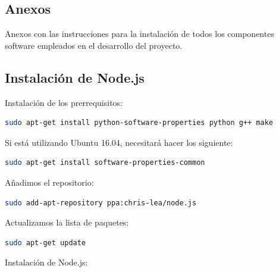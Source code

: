 

\newpage

\begin{appendix}
\backmatter

\chapter{Anexos}
\label{appendix:anexos}


Anexos con las instrucciones para la instalación de todos los componentes software empleados en el desarrollo del proyecto.\\

\section{Instalación de Node.js}


Instalación de los prerrequisitos:\\

\begin{lstlisting}[language=bash]
sudo apt-get install python-software-properties python g++ make
\end{lstlisting}


Si está utilizando Ubuntu 16.04, necesitará hacer los siguiente:\\

\begin{lstlisting}[language=bash]
sudo apt-get install software-properties-common
\end{lstlisting}


Añadimos el repositorio:\\

\begin{lstlisting}[language=bash]
sudo add-apt-repository ppa:chris-lea/node.js
\end{lstlisting}

Actualizamos la lista de paquetes:\\

\begin{lstlisting}[language=bash]
sudo apt-get update
\end{lstlisting}

Instalación de  Node.js:\\


\end{appendix}
